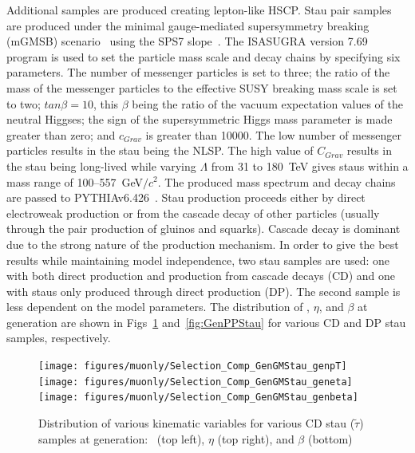 
Additional samples are produced creating lepton-like HSCP. Stau pair samples
are produced under the minimal gauge-mediated supersymmetry breaking (mGMSB) scenario~\cite{Giudice:1998bp} using the SPS7 slope~\cite{Allanach:2002nj}.
The ISASUGRA version 7.69~\cite{Paige:2003mg} program is used to set the particle mass scale and decay chains by specifying six parameters.
The number of messenger particles is set to three; the ratio of the mass of the messenger particles to the effective SUSY breaking mass scale is set to two;
$tan \beta = 10$, this $\beta$ being the ratio of the vacuum expectation values of the neutral Higgses;
the sign of the supersymmetric Higgs mass parameter is made greater than zero; and $c_{Grav}$ is greater than 10000.
The low number of messenger particles results in the stau being the NLSP.
The high value of $C_{Grav}$ results in the stau being long-lived while varying $\Lambda$ from 31 to 180~TeV gives staus within a mass range of 100--557~GeV$/c^2$. 
The produced mass spectrum and decay chains are passed to PYTHIAv6.426~\cite{Sjostrand:2006za}. 
Stau production proceeds either by direct electroweak production or from the cascade
decay of other particles (usually through the pair production of gluinos and squarks). Cascade decay is dominant due to the strong nature of the production mechanism.
In order to give the best results while maintaining model independence, two stau samples are used: one with both direct production and production from cascade decays (CD)
and one with staus only produced through direct production (DP). The second sample is less dependent on the model parameters. The distribution of \pt, $\eta$, and $\beta$ at generation
are shown in Figs~\ref{fig:GenGMStau} and~\ref{fig:GenPPStau} for various CD and DP stau samples, respectively.

\begin{figure}
 \begin{center}
  \texttt{[image: figures/muonly/Selection\_Comp\_GenGMStau\_genpT]}
  \texttt{[image: figures/muonly/Selection\_Comp\_GenGMStau\_geneta]}
  \texttt{[image: figures/muonly/Selection\_Comp\_GenGMStau\_genbeta]}
 \end{center}
 \caption[Distribution of \pt, $\eta$, and $\beta$ for various CD stau samples at generation]
{Distribution of various kinematic variables for various CD stau ($\tilde{\tau}$) samples at generation:
\pt\ (top left), $\eta$ (top right), and $\beta$ (bottom)
   \label{fig:GenGMStau}}
\end{figure}

